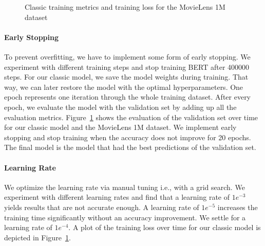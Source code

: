 \begin{figure}[htbp]
    \centering
    \caption{Classic training metrics and training loss for the MovieLens 1M dataset}
    \label{fig:classic_training}
\end{figure}

\paragraph{Early Stopping}
To prevent overfitting, we have to implement some form of early stopping. We experiment with different training steps and stop training BERT after 400000 steps. For our classic model, we save the model weights during training. That way, we can later restore the model with the optimal hyperparameters. One epoch represents one iteration through the whole training dataset. After every epoch, we evaluate the model with the validation set by adding up all the evaluation metrics. Figure~\ref{fig:classic_training} shows the evaluation of the validation set over time for our classic model and the MovieLens 1M dataset. We implement early stopping and stop training when the accuracy does not improve for 20 epochs. The final model is the model that had the best predictions of the validation set.

\paragraph{Learning Rate}
We optimize the learning rate via manual tuning i.e., with a grid search. We experiment with different learning rates and find that a learning rate of $1e^{-3}$ yields results that are not accurate enough. A learning rate of $1e^{-5}$ increases the training time significantly without an accuracy improvement. We settle for a learning rate of $1e^{-4}$. A plot of the training loss over time for our classic model is depicted in Figure~\ref{fig:classic_training}.


